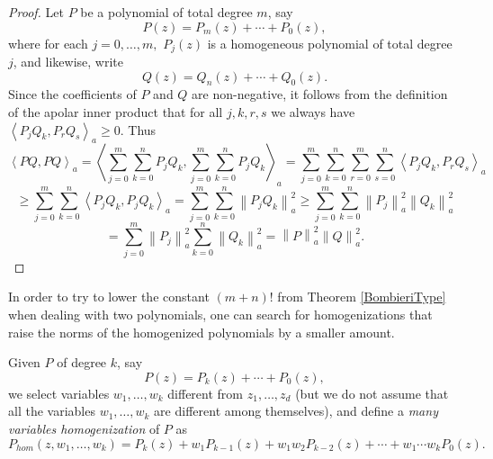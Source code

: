 \documentclass[12pt]{amsart}
\begin{document}
\begin{proof} Let $P$ be a polynomial of total degree $m$, say 
\begin{equation*}
P\left( z \right) =P_{m}\left( z \right) +\cdots +P_{0}\left( z \right),
\end{equation*}
where for each $j=0, \dots ,m,$
 $P_{j}\left( z\right) $ is a homogeneous polynomial
of total degree $j$, and likewise, write
\begin{equation*}
Q\left( z \right) = Q_{n} \left( z \right) +\cdots +Q_{0}\left( z \right).
\end{equation*}
Since the coefficients of $P$ and $Q$ are non-negative, it follows from the definition of the apolar inner product that for all $j,k,r,s$ we always have $\left\langle  P_j Q_k, P_r Q_s\right\rangle_{a} \ge 0$. Thus 
\begin{equation}
\left\langle P Q, P Q\right\rangle_{a} 
=
\left\langle \sum_{j=0}^m
\sum_{k = 0}^{n} P_j Q_k, \sum_{j=0}^m \sum_{k = 0}^{n} P_j Q_k\right\rangle_{a} 
=
\sum_{j=0}^m \sum_{k = 0}^{n} \sum_{r=0}^m
\sum_{s = 0}^{n} \left\langle  P_j Q_k, P_r Q_s\right\rangle_{a} 
\end{equation}
\begin{equation}
\ge
\sum_{j=0}^m \sum_{k = 0}^{n}  \left\langle  P_j Q_k, P_j Q_k\right\rangle_{a} 
=
\sum_{j=0}^m \sum_{k = 0}^{n}  \left\| P_j Q_k\right\|_{a}^2
\ge
\sum_{j=0}^m \sum_{k = 0}^{n}  \left\| P_j \right\|_{a}^2 \left\|Q_k\right\|_{a}^2
\end{equation}
\begin{equation}
=
\sum_{j=0}^m   \left\| P_j \right\|_{a}^2 \sum_{k = 0}^{n} \left\|Q_k\right\|_{a}^2
= 
\left\| P \right\|_{a}^2 \left\| Q \right\|_{a}^2.
\end{equation}
\end{proof}


In order to try to lower the constant $(m + n)!$ from Theorem \ref{BombieriType} when dealing with two polynomials, one can search for homogenizations that  raise the norms of the homogenized polynomials by a smaller amount.


 Given $P$ of  degree $k$, say
\begin{equation*}
P\left( z \right) =P_{k}\left( z \right) +\cdots +P_{0}\left( z \right),
\end{equation*}
we select  variables $w_1, \dots, w_k$ different from $z_1, \dots, z_d$ (but we do not assume that all the variables $w_1, \dots, w_k$ are different among themselves), and define a {\em many variables homogenization} of $P$ as
\begin{equation*}
P_{hom} \left( z , w_1, \dots, w_k \right) = P_{k}\left( z \right) + w_1 P_{k -1}\left( z \right) + w_1 w_2 P_{k -2}\left( z \right)  + \cdots +  w_1 \cdots w_k P_{0}\left( z \right).
\end{equation*}
\end{document}
